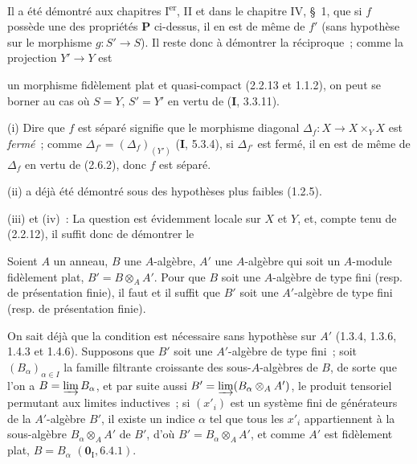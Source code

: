 Il a été démontré aux chapitres I\textsuperscript{er}, II et dans le chapitre
IV, \S~1, que si $f$ possède une des propriétés $\boldsymbol{P}$ ci-dessus, il en est de
même de $f'$ (sans hypothèse sur le morphisme $g:S'\to S$). Il reste donc à
démontrer la réciproque~; comme la projection $Y'\to Y$ est

un morphisme fidèlement plat et quasi-compact (2.2.13 et 1.1.2), on peut se
borner au cas où $S=Y$, $S'=Y'$ en vertu de (\textbf{I}, 3.3.11).

(i) Dire que $f$ est séparé signifie que le morphisme diagonal
$\Delta_f:X\to X\times_Y X$ est \emph{fermé}~; comme
$\Delta_{f'}=(\Delta_f)_{(Y')}$ (\textbf{I}, 5.3.4), si $\Delta_{f'}$ est fermé, il
en est de même de $\Delta_f$ en vertu de (2.6.2), donc $f$ est séparé.

(ii) a déjà été démontré sous des hypothèses plus faibles (1.2.5).

(iii) et (iv)~: La question est évidemment locale sur $X$ et
$Y$, et, compte tenu de (2.2.12), il suffit donc de démontrer le

\begin{lemma}[2.7.1.1]
\label{IV.2.7.1.1-fr}
Soient $A$ un anneau, $B$ une $A$-algèbre, $A'$ une $A$-algèbre qui soit un
$A$-module fidèlement plat, $B'=B\otimes_A A'$. Pour que $B$ soit une
$A$-algèbre de type fini \textup{(resp.} de présentation finie\textup{)}, il faut et il suffit
que $B'$ soit une $A'$-algèbre de type fini \textup{(resp.} de présentation finie\textup{)}.
\end{lemma}

On sait déjà que la condition est nécessaire sans hypothèse sur $A'$
(1.3.4, 1.3.6, 1.4.3 et 1.4.6). Supposons que $B'$ soit une $A'$-algèbre de
type fini~; soit $(B_\alpha)_{\alpha\in I}$ la famille filtrante croissante
des sous-$A$-algèbres de $B$, de sorte que l'on a
$B=\varinjlim B_\alpha$, et par suite aussi
$B'=\varinjlim(B_\alpha\otimes_A A')$, le produit tensoriel permutant aux
limites inductives~; si $(x'_i)$ est un système fini de générateurs de la
$A'$-algèbre $B'$, il existe un indice $\alpha$ tel que tous les $x'_i$
appartiennent à la sous-algèbre $B_\alpha\otimes_A A'$ de $B'$, d'où
$B'=B_\alpha\otimes_A A'$, et comme $A'$ est fidèlement plat,
$B=B_\alpha$ $(\mathbf{0}_{\mathrm I},6.4.1)$.

